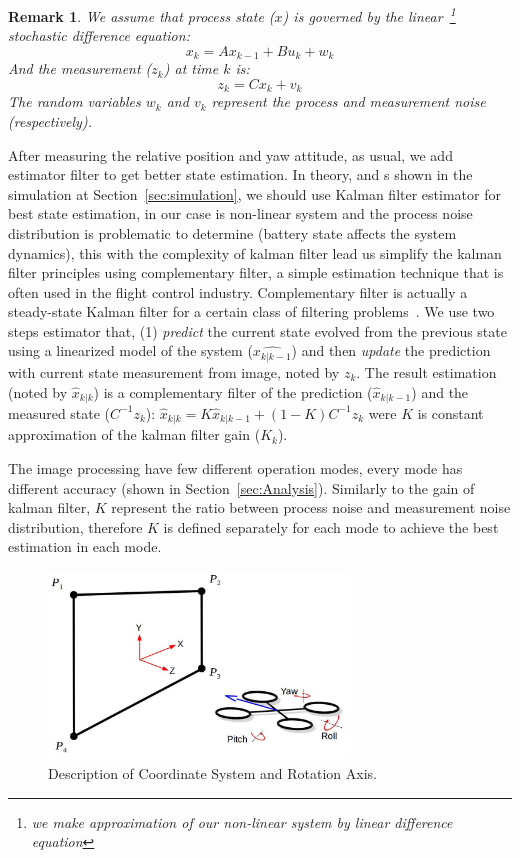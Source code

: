 \documentclass{sig-alternate-ipsn13}
\newtheorem*{remark}{Remark}
\begin{document}
\begin{remark}
    We assume that process state ($x$) is governed by the linear~\footnote{we make approximation of our non-linear system by linear difference equation} stochastic difference equation:
    $$x_{k}=Ax_{k-1} + Bu_{k} + w_{k}$$
    And the measurement ($z_k$) at time $k$ is:
    $$z_k=Cx_k+v_k$$
    The random variables $w_k$ and $v_k$ represent the process and measurement noise (respectively).
\end{remark}

After measuring the relative position and yaw attitude, as usual, we add estimator filter to get better state estimation. 
In theory, and s shown in the simulation at Section~\ref{sec:simulation}, we should use Kalman filter estimator for best state estimation, in our case is non-linear system and the process noise distribution is problematic to determine (battery state affects the system dynamics), this with the complexity of kalman filter lead us simplify the kalman filter principles using complementary filter, a simple estimation technique that is often used in the flight control industry.
Complementary filter is actually a steady-state Kalman filter for a certain class of filtering problems~\cite{complementaryVSKalman}.
We use two steps estimator that, (1) \textit{predict} the current state evolved from the previous state using a linearized model of the system ($\hat{x_{k|k-1}}$) and then \textit{update} the prediction with current state measurement from image, noted by $z_k$.
The result estimation (noted by $\hat{x}_{k|k}$) is a complementary filter of the prediction ($\hat{x}_{k|k-1}$) and the measured state ($C^{-1}z_k$):
$ \hat{x}_{k|k} = K \hat{x}_{k|k-1} + (1-K) C^{-1}z_k $ were $K$ is constant approximation of the kalman filter gain ($K_k$).

The image processing have few different operation modes, every mode has different accuracy (shown in Section~\ref{sec:Analysis}).
Similarly to the gain of kalman filter, $K$ represent the ratio between process noise and measurement noise distribution, therefore $K$ is defined separately for each mode to achieve the best estimation in each mode.

\begin{figure}[htbp]
    \centerline{\includegraphics[width=80mm]{axis.jpg}}
    \caption{Description of Coordinate System and Rotation Axis.}
    \label{fig:axis}
\end{figure}
\end{document}
